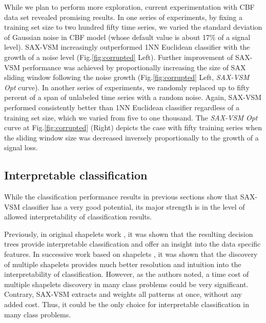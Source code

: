 \documentclass[conference]{IEEEtran}
\begin{document}
While we plan to perform more exploration, current experimentation with CBF data set revealed 
promising results. 
In one series of experiments, by fixing a training set size to two hundred fifty time series, we
varied the standard deviation of Gaussian noise in CBF model (whose default value is about 
17\% of a signal level). SAX-VSM increasingly outperformed 1NN Euclidean classifier 
with the growth of a noise level (Fig.\ref{fig:corrupted} Left). 
Further improvement of SAX-VSM performance was achieved by proportionally increasing
the size of SAX sliding window following the noise growth (Fig.\ref{fig:corrupted}
Left, \textit{SAX-VSM Opt} curve). 
In another series of experiments, we randomly replaced up to fifty percent of a span of unlabeled
time series with a random noise. Again, SAX-VSM performed consistently better than 
1NN Euclidean classifier regardless of a training set size, which we varied from five to
one thousand. The \textit{SAX-VSM Opt} curve at Fig.\ref{fig:corrupted} (Right) depicts the case
with fifty training series when the sliding window size was decreased inversely proportionally 
to the growth of a signal loss.

\subsection{Interpretable classification}
While the classification performance results in previous sections show that SAX-VSM 
classifier has a very good potential, its major strength is in the level of allowed 
interpretability of classification results. 

Previously, in original shapelets work \cite{shapelet, logical}, it was shown that the 
resulting decision trees provide interpretable classification and offer an insight into the data
specific features. In successive work based on shapelets \cite{bagnal}, it was shown that
the discovery of multiple shapelets provides much better resolution and intuition into 
the interpretability of classification. 
However, as the authors noted, a time cost of multiple shapelets discovery
in many class problems could be very significant. Contrary, SAX-VSM extracts and weights 
all patterns at once, without any added cost. Thus, it could be the only choice for interpretable 
classification in many class problems.
\end{document}
